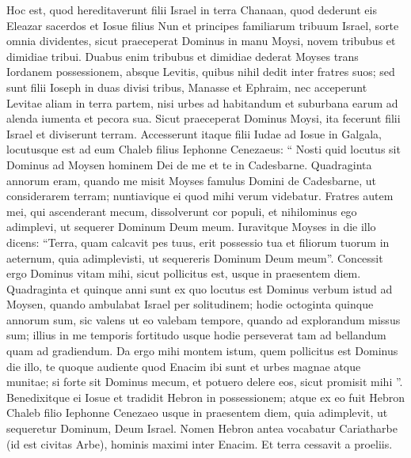 \begin{biblechapter}
\begin{biblechapter}
\begin{biblechapter}
\begin{biblechapter}
\begin{biblechapter}
\begin{biblechapter}
\begin{biblechapter}
\begin{biblechapter}
\begin{biblechapter}
\begin{biblechapter}
\begin{biblechapter}
\begin{biblechapter}
\begin{biblechapter}
\begin{biblechapter}
\verse Hoc est, quod hereditaverunt filii Israel in terra Chanaan, quod dederunt eis Eleazar sacerdos et Iosue filius Nun et principes familiarum tribuum Israel, 
\verse sorte omnia dividentes, sicut praeceperat Dominus in manu Moysi, novem tribubus et dimidiae tribui. 
\verse Duabus enim tribubus et dimidiae dederat Moyses trans Iordanem possessionem, absque Levitis, quibus nihil dedit inter fratres suos; 
\verse sed sunt filii Ioseph in duas divisi tribus, Manasse et Ephraim, nec acceperunt Levitae aliam in terra partem, nisi urbes ad habitandum et suburbana earum ad alenda iumenta et pecora sua. 
\verse Sicut praeceperat Dominus Moysi, ita fecerunt filii Israel et diviserunt terram.
 \verse Accesserunt itaque filii Iudae ad Iosue in Galgala, locutusque est ad eum Chaleb filius Iephonne Cenezaeus: “ Nosti quid locutus sit Dominus ad Moysen hominem Dei de me et te in Cadesbarne. 
\verse Quadraginta annorum eram, quando me misit Moyses famulus Domini de Cadesbarne, ut considerarem terram; nuntiavique ei quod mihi verum videbatur. 
\verse Fratres autem mei, qui ascenderant mecum, dissolverunt cor populi, et nihilominus ego adimplevi, ut sequerer Dominum Deum meum. 
\verse Iuravitque Moyses in die illo dicens: “Terra, quam calcavit pes tuus, erit possessio tua et filiorum tuorum in aeternum, quia adimplevisti, ut sequereris Dominum Deum meum”. 
\verse Concessit ergo Dominus vitam mihi, sicut pollicitus est, usque in praesentem diem. Quadraginta et quinque anni sunt ex quo locutus est Dominus verbum istud ad Moysen, quando ambulabat Israel per solitudinem; hodie octoginta quinque annorum sum, 
\verse sic valens ut eo valebam tempore, quando ad explorandum missus sum; illius in me temporis fortitudo usque hodie perseverat tam ad bellandum quam ad gradiendum. 
\verse Da ergo mihi montem istum, quem pollicitus est Dominus die illo, te quoque audiente quod Enacim ibi sunt et urbes magnae atque munitae; si forte sit Dominus mecum, et potuero delere eos, sicut promisit mihi ”.
 \verse Benedixitque ei Iosue et tradidit Hebron in possessionem; 
\verse atque ex eo fuit Hebron Chaleb filio Iephonne Cenezaeo usque in praesentem diem, quia adimplevit, ut sequeretur Dominum, Deum Israel. 
\verse Nomen Hebron antea vocabatur Cariatharbe (id est civitas Arbe), hominis maximi inter Enacim. Et terra cessavit a proeliis.
 

\end{biblechapter}
\end{biblechapter}
\end{biblechapter}
\end{biblechapter}
\end{biblechapter}
\end{biblechapter}
\end{biblechapter}
\end{biblechapter}
\end{biblechapter}
\end{biblechapter}
\end{biblechapter}
\end{biblechapter}
\end{biblechapter}
\end{biblechapter}

